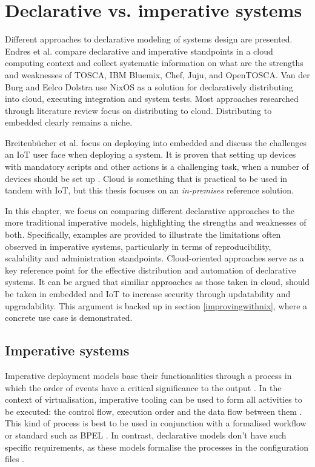 \chapter{Declarative vs. imperative systems} \label{imperative}

Different approaches to declarative modeling of
systems design are presented. Endres et al. \cite{endres2017declarative} compare declarative and imperative
standpoints in a cloud computing context and collect systematic
information on what are the strengths and weaknesses of TOSCA, IBM
Bluemix, Chef, Juju, and OpenTOSCA. Van
der Burg and Eelco Dolstra \cite{van2010declarative} use NixOS as a solution for declaratively
distributing into cloud, executing integration and system tests. Most approaches researched through
literature review focus on distributing to cloud. Distributing to
embedded clearly remains a niche.

Breitenbücher et al. \cite{breitenbucher2017declarative} focus on deploying into embedded and discuss
the challenges an IoT user face when deploying a system. It is proven
that setting up devices with mandatory scripts and other actions is a
challenging task, when a number of devices should be set up \cite{breitenbucher2017declarative}. Cloud is
something that is practical to be used in tandem with IoT, but this thesis
focuses on an \textit{in-premises} reference
solution. 

In this chapter, we focus on comparing different declarative
approaches to the more traditional imperative models, highlighting the
strengths and weaknesses of both. Specifically, examples are provided
to illustrate the limitations often observed in imperative systems,
particularly in terms of reproducibility, scalability and
administration standpoints. Cloud-oriented approaches serve as a key
reference point for the effective distribution and automation of
declarative systems. It can be argued that similiar approaches as
those taken in cloud, should be taken in embedded and IoT to increase
security through updatability and upgradability. This argument is backed up
in section \ref{improvingwithnix}, where a concrete use case is demonstrated.

\section{Imperative systems}

Imperative deployment models base their functionalities through a
process in which the order of events have a critical significance to
the output \cite{breitenbucher2017declarative}. In the context of
virtualisation, imperative tooling can be used to form all
activities to be executed: the control flow, execution order
and the data flow between them \cite{endres2017declarative}. This kind
of process is best to be used in conjunction with a formalised
workflow or standard such as BPEL \cite{endres2017declarative}. In
contrast, declarative models don't have such specific requirements, as
these models formalise the processes in the configuration files
\cite{endres2017declarative}.

